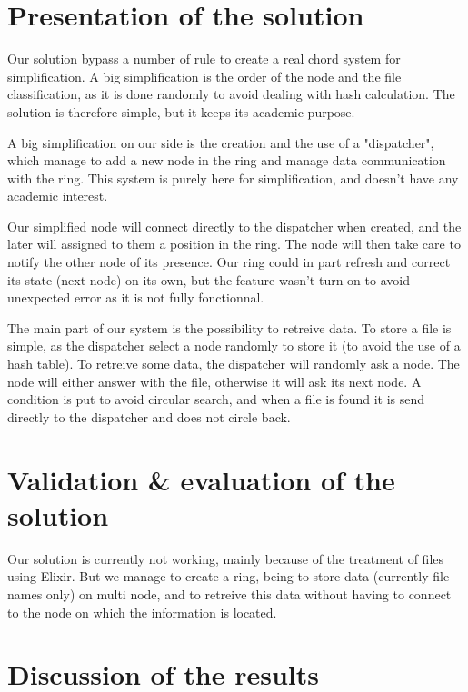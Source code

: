 \documentclass{article}
\begin{document}
\pagebreak

\section{Presentation of the solution}

Our solution bypass a number of rule to create a real chord system for simplification. A big simplification is the order of the node and the file classification, as it is done randomly to avoid dealing with hash calculation. The solution is therefore simple, but it keeps its academic purpose.

A big simplification on our side is the creation and the use of a "dispatcher", which manage to add a new node in the ring and manage data communication with the ring. This system is purely here for simplification, and doesn't have any academic interest.

Our simplified node will connect directly to the dispatcher when created, and the later will assigned to them a position in the ring. The node will then take care to notify the other node of its presence. Our ring could in part refresh and correct its state (next node) on its own, but the feature wasn't turn on to avoid unexpected error as it is not fully fonctionnal.

The main part of our system is the possibility to retreive data. To store a file is simple, as the dispatcher select a node randomly to store it (to avoid the use of a hash table). To retreive some data, the dispatcher will randomly ask a node. The node will either answer with the file, otherwise it will ask its next node. A condition is put to avoid circular search, and when a file is found it is send directly to the dispatcher and does not circle back.

\section{Validation \& evaluation of the solution}

Our solution is currently not working, mainly because of the treatment of files using Elixir. But we manage to create a ring, being to store data (currently file names only) on multi node, and to retreive this data without having to connect to the node on which the information is located. 


\section{Discussion of the results}
\end{document}
